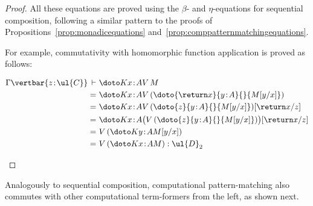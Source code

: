 \begin{proof}
All these equations are proved using the $\beta$- and $\eta$-equations for sequential composition, following a similar pattern to the proofs of Propositions~\ref{prop:monadicequations} and~\ref{prop:comppatternmatchingequations}. 

\pagebreak

For example, commutativity with homomorphic function application is proved as follows:
\begin{fleqn}[0.3cm]
\begin{align*}
\Gamma \vertbar {z \!:\! \ul{C}} \,\vdash\,\, & \doto K {x \!:\! A} {} {V\, M}
\\
=\,\, & \doto K {x \!:\! A} {} {V\, (\doto {\return x} {y \!:\! A} {} {M[y/x]})}
\\
=\,\, & \doto K {x \!:\! A} {} {V\, (\doto {z} {y \!:\! A} {} {M[y/x]})[\return x/z]}
\\
=\,\, & \doto K {x \!:\! A} {} {\big(V\, (\doto {z} {y \!:\! A} {} {M[y/x]})\big)[\return x/z]}
\\
=\,\, & V\, (\doto K {y \!:\! A} {} {M[y/x]})
\\
=\,\, & V\, (\doto K {x \!:\! A} {} {M}) : \ul{D}_2
\end{align*}
\end{fleqn}
\end{proof}

Analogously to sequential composition, computational pattern-matching also commutes with other computational term-formers from the left, as shown next.

